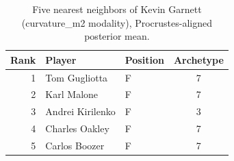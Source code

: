 \begin{table}[htbp]
  \centering\small
  \begin{tabular}{rllc}
    \toprule
    Rank & Player & Position & Archetype \\
    \midrule
    1 & Tom Gugliotta & F & 7 \\
    2 & Karl Malone & F & 7 \\
    3 & Andrei Kirilenko & F & 3 \\
    4 & Charles Oakley & F & 7 \\
    5 & Carlos Boozer & F & 7 \\
    \bottomrule
  \end{tabular}
  \caption{Five nearest neighbors of Kevin Garnett (curvature_m2 modality), Procrustes-aligned posterior mean.}
  \label{tab:Kevin_Garnett_neighbors_curvature_m2}
\end{table}

